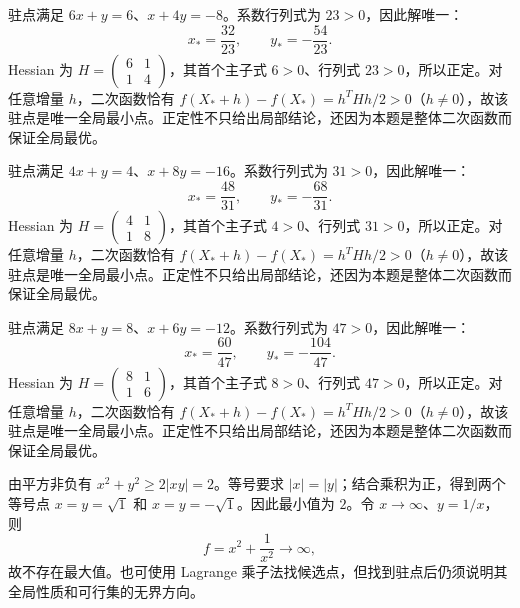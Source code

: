 \documentclass[12pt,fontset=fandol]{ctexart}
\begin{document}
\begin{solve}\label{ans:c34q17}
驻点满足 $6x+y=6$、$x+4y=-8$。系数行列式为 $23>0$，因此解唯一：
\[
x_*=\frac{32}{23},\qquad y_*=-\frac{54}{23}.
\]
Hessian 为 $H=\begin{pmatrix}6&1\\1&4\end{pmatrix}$，其首个主子式 $6>0$、行列式 $23>0$，所以正定。对任意增量 $h$，二次函数恰有 $f(X_*+h)-f(X_*)=h^THh/2>0$（$h\ne0$），故该驻点是唯一全局最小点。正定性不只给出局部结论，还因为本题是整体二次函数而保证全局最优。
\end{solve}

\begin{solve}\label{ans:c34q18}
驻点满足 $4x+y=4$、$x+8y=-16$。系数行列式为 $31>0$，因此解唯一：
\[
x_*=\frac{48}{31},\qquad y_*=-\frac{68}{31}.
\]
Hessian 为 $H=\begin{pmatrix}4&1\\1&8\end{pmatrix}$，其首个主子式 $4>0$、行列式 $31>0$，所以正定。对任意增量 $h$，二次函数恰有 $f(X_*+h)-f(X_*)=h^THh/2>0$（$h\ne0$），故该驻点是唯一全局最小点。正定性不只给出局部结论，还因为本题是整体二次函数而保证全局最优。
\end{solve}

\begin{solve}\label{ans:c34q19}
驻点满足 $8x+y=8$、$x+6y=-12$。系数行列式为 $47>0$，因此解唯一：
\[
x_*=\frac{60}{47},\qquad y_*=-\frac{104}{47}.
\]
Hessian 为 $H=\begin{pmatrix}8&1\\1&6\end{pmatrix}$，其首个主子式 $8>0$、行列式 $47>0$，所以正定。对任意增量 $h$，二次函数恰有 $f(X_*+h)-f(X_*)=h^THh/2>0$（$h\ne0$），故该驻点是唯一全局最小点。正定性不只给出局部结论，还因为本题是整体二次函数而保证全局最优。
\end{solve}

\begin{solve}\label{ans:c34q20}
由平方非负有 $x^2+y^2\ge2|xy|=2$。等号要求 $|x|=|y|$；结合乘积为正，得到两个等号点 $x=y=\sqrt{1}$ 和 $x=y=-\sqrt{1}$。因此最小值为 $2$。令 $x\to\infty$、$y=1/x$，则
\[
f=x^2+\frac{1}{x^2}\to\infty,
\]
故不存在最大值。也可使用 Lagrange 乘子法找候选点，但找到驻点后仍须说明其全局性质和可行集的无界方向。
\end{solve}
\end{document}
